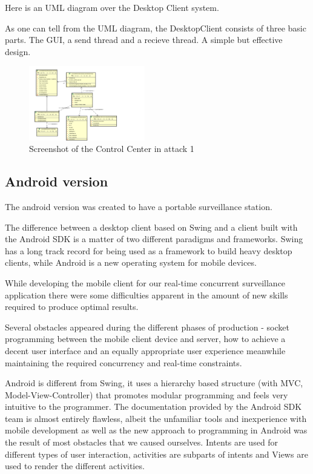 \documentclass[8pt,titlepage]{article}
\begin{document}
Here is an UML diagram over the Desktop Client system. 

As one can tell from the UML diagram, the DesktopClient consists of three basic parts. The GUI, a send thread and a recieve thread. A simple but effective design.

\begin{figure}[hbp]
\includegraphics[width=0.45\textwidth]{../uml/desktop-client.png}
\caption{Screenshot of the Control Center in attack 1}
\end{figure}


\subsection{Android version}
The android version was created to have a portable surveillance station.

The difference between a desktop client based on Swing and a client built with the Android SDK is a matter of two different paradigms and frameworks. Swing has a long track record for being used as a framework to build heavy desktop clients, while Android is a new operating system for mobile devices. 

While developing the mobile client for our real-time concurrent surveillance application there were some difficulties apparent in the amount of new skills required to produce optimal results. 

Several obstacles appeared during the different phases of production - socket programming between the mobile client device and server, how to achieve a decent user interface and an equally appropriate user experience meanwhile maintaining the required concurrency and real-time constraints. 

Android is different from Swing, it uses a hierarchy based structure (with MVC, Model-View-Controller) that promotes modular programming and feels very intuitive to the programmer. The documentation provided by the Android SDK team is almost entirely flawless, albeit the unfamiliar tools and inexperience with mobile development as well as the new approach to programming in Android was the result of most obstacles that we caused ourselves.
Intents are used for different types of user interaction, activities are subparts of intents and Views are used to render the different activities. 
\end{document}
